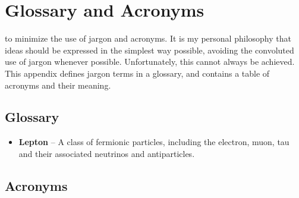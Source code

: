 %
%
%
%


\chapter{Glossary and Acronyms}
\label{app_glossary}

 to minimize the use of jargon and
acronyms. It is my personal philosophy that ideas should be expressed in the 
simplest way possible, avoiding the convoluted use of jargon whenever possible. 
Unfortunately, this cannot always be achieved.  This appendix defines jargon 
terms in a glossary, and contains a table of acronyms and their meaning.


\section{Glossary}
\label{jargonapp}
\begin{itemize}

\item \textbf{Lepton} -- A class of fermionic particles, including the electron, muon, tau and their associated neutrinos and antiparticles.

\end{itemize}


\section{Acronyms}
\label{acronymsec}


